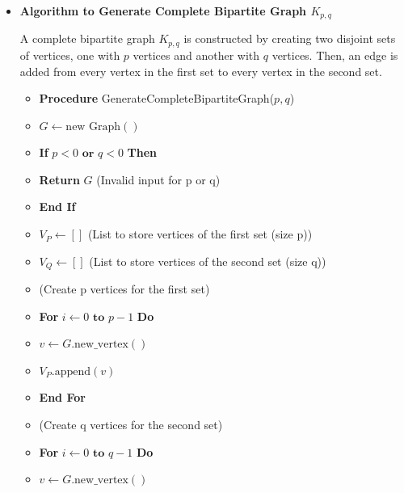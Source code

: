 \documentclass{article}
\begin{document}
\begin{itemize}
    \item \textbf{Algorithm to Generate Complete Bipartite Graph $K_{p,q}$}
    
    A complete bipartite graph $K_{p,q}$ is constructed by creating two disjoint sets of vertices, one with $p$ vertices and another with $q$ vertices. Then, an edge is added from every vertex in the first set to every vertex in the second set.
    
    \begin{itemize}
        \item \textbf{Procedure} GenerateCompleteBipartiteGraph($p, q$)
        \item \hspace{0.5cm} $G \gets \text{new Graph}()$
        \item \hspace{0.5cm} \textbf{If} $p < 0 \textbf{ or } q < 0$ \textbf{Then}
        \item \hspace{1cm} \textbf{Return} $G$ (Invalid input for p or q)
        \item \hspace{0.5cm} \textbf{End If}
        \item \hspace{0.5cm} $V_P \gets []$ (List to store vertices of the first set (size p))
        \item \hspace{0.5cm} $V_Q \gets []$ (List to store vertices of the second set (size q))
        \item \hspace{0.5cm} (Create p vertices for the first set)
        \item \hspace{0.5cm} \textbf{For} $i \gets 0 \textbf{ to } p-1$ \textbf{Do}
        \item \hspace{1cm} $v \gets G.\text{new\_vertex}()$
        \item \hspace{1cm} $V_P.\text{append}(v)$
        \item \hspace{0.5cm} \textbf{End For}
        \item \hspace{0.5cm} (Create q vertices for the second set)
        \item \hspace{0.5cm} \textbf{For} $i \gets 0 \textbf{ to } q-1$ \textbf{Do}
        \item \hspace{1cm} $v \gets G.\text{new\_vertex}()$

\end{itemize}
\end{itemize}
\end{document}
